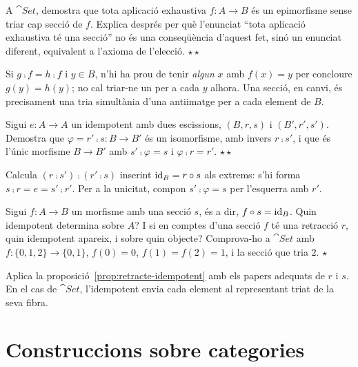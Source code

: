 \begin{exercici}
A $\cat{Set}$, demostra que tota aplicació exhaustiva $f\colon A\to B$ és un epimorfisme sense triar cap secció de $f$. Explica després per què l'enunciat \enquote{tota aplicació exhaustiva té una secció} no és una conseqüència d'aquest fet, sinó un enunciat diferent, equivalent a l'axioma de l'elecció. \hfill{\normalfont$\star\star$}
\begin{indicacio}
Si $g\comp f=h\comp f$ i $y\in B$, n'hi ha prou de tenir \emph{algun} $x$ amb $f(x)=y$ per concloure $g(y)=h(y)$; no cal triar-ne un per a cada $y$ alhora. Una secció, en canvi, és precisament una tria simultània d'una antiimatge per a cada element de $B$.
\end{indicacio}
\end{exercici}

\begin{exercici}
Sigui $e\colon A\to A$ un idempotent amb dues escissions, $(B,r,s)$ i $(B',r',s')$. Demostra que $\varphi=r'\comp s\colon B\to B'$ és un isomorfisme, amb invers $r\comp s'$, i que és l'únic morfisme $B\to B'$ amb $s'\comp\varphi=s$ i $\varphi\comp r=r'$. \hfill{\normalfont$\star\star$}
\begin{indicacio}
Calcula $(r\comp s')\comp(r'\comp s)$ inserint $\operatorname{id}_B=r\circ s$ als extrems: s'hi forma $s\comp r=e=s'\comp r'$. Per a la unicitat, compon $s'\comp\varphi=s$ per l'esquerra amb $r'$.
\end{indicacio}
\end{exercici}

\begin{exercici}
Sigui $f\colon A\to B$ un morfisme amb una secció $s$, és a dir, $f\circ s=\operatorname{id}_B$. Quin idempotent determina sobre $A$? I si en comptes d'una secció $f$ té una retracció $r$, quin idempotent apareix, i sobre quin objecte? Comprova-ho a $\cat{Set}$ amb $f\colon\{0,1,2\}\to\{0,1\}$, $f(0)=0$, $f(1)=f(2)=1$, i la secció que tria $2$. \hfill{\normalfont$\star$}
\begin{indicacio}
Aplica la proposició~\ref{prop:retracte-idempotent} amb els papers adequats de $r$ i $s$. En el cas de $\cat{Set}$, l'idempotent envia cada element al representant triat de la seva fibra.
\end{indicacio}
\end{exercici}

\section{Construccions sobre categories}

